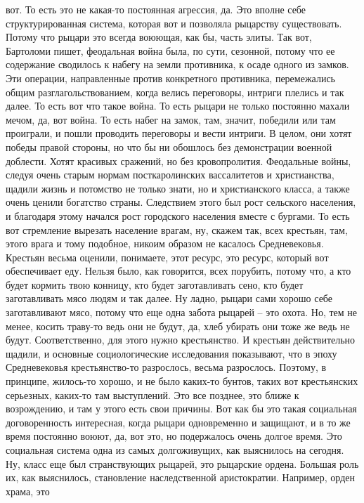 вот. То есть это не какая-то постоянная агрессия, да. Это вполне себе
структурированная система, которая вот и позволяла рыцарству существовать.
Потому что рыцари это всегда воюющая, как бы, часть элиты. Так вот, Бартоломи
пишет, феодальная война была, по сути, сезонной, потому что ее содержание
сводилось к набегу на земли противника, к осаде одного из замков. Эти операции,
направленные против конкретного противника, перемежались общим
разглагольствованием, когда велись переговоры, интриги плелись и так далее. То
есть вот что такое война. То есть рыцари не только постоянно махали мечом, да,
вот война. То есть набег на замок, там, значит, победили или там проиграли, и
пошли проводить переговоры и вести интриги. В целом, они хотят победы правой
стороны, но что бы ни обошлось без демонстрации военной доблести. Хотят красивых
сражений, но без кровопролития. Феодальные войны, следуя очень старым нормам
посткаролинских вассалитетов и христианства, щадили жизнь и потомство не только
знати, но и христианского класса, а также очень ценили богатство страны.
Следствием этого был рост сельского населения, и благодаря этому начался рост
городского населения вместе с бургами. То есть вот стремление вырезать население
врагам, ну, скажем так, всех крестьян, там, этого врага и тому подобное, никоим
образом не касалось Средневековья. Крестьян весьма оценили, понимаете, этот
ресурс, это ресурс, который вот обеспечивает еду. Нельзя было, как говорится,
всех порубить, потому что, а кто будет кормить твою конницу, кто будет
заготавливать сено, кто будет заготавливать мясо людям и так далее. Ну ладно,
рыцари сами хорошо себе заготавливают мясо, потому что еще одна забота рыцарей –
это охота. Но, тем не менее, косить траву-то ведь они не будут, да, хлеб убирать
они тоже же ведь не будут. Соответственно, для этого нужно крестьянство. И
крестьян действительно щадили, и основные социологические исследования
показывают, что в эпоху Средневековья крестьянство-то разрослось, весьма
разрослось. Поэтому, в принципе, жилось-то хорошо, и не было каких-то бунтов,
таких вот крестьянских серьезных, каких-то там выступлений. Это все позднее, это
ближе к возрождению, и там у этого есть свои причины. Вот как бы это такая
социальная договоренность интересная, когда рыцари одновременно и защищают, и в
то же время постоянно воюют, да, вот это, но подержалось очень долгое время. Это
социальная система одна из самых долгоживущих, как выяснилось на сегодня. Ну,
класс еще был странствующих рыцарей, это рыцарские ордена. Большая роль их, как
выяснилось, становление наследственной аристократии. Например, орден храма, это
